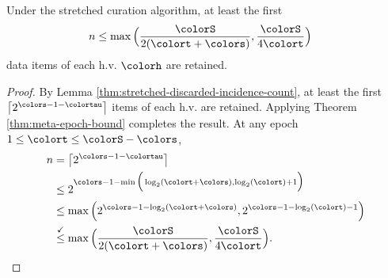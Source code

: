 \begin{corollary}
\label{thm:stretched-reservation-count}
Under the stretched curation algorithm, at least the first
\begin{align*}
n &\leq
\max\Big(
  \frac{\colorS}{2(\colort + \colors)},
  \frac{\colorS}{4\colort}
\Big)
\end{align*}
data items of each h.v. $\colorh$ are retained.
\end{corollary}
\begin{proof}

By Lemma \ref{thm:stretched-discarded-incidence-count}, at least the first $\left\lceil 2^{\colors - 1 - \colortau} \right\rceil$ items of each h.v. are retained.
Applying Theorem \ref{thm:meta-epoch-bound} completes the result.
At any epoch $1 \leq \colort \leq \colorS - \colors$,
\begin{align*}
n
&= \left\lceil 2^{\colors - 1 - \colortau} \right\rceil\\
&\leq2^{\colors - 1 - \min\Big(
  \log_2(\colort + \colors),
  \log_2(\colort) + 1
\Big)}\\
&\leq \max\Big(
  2^{\colors - 1 - \log_2(\colort + \colors)},
  2^{\colors - 1 - \log_2(\colort) - 1}
\Big)\\
&\stackrel{\checkmark}{\leq} \max\Big(
  \frac{\colorS}{2(\colort + \colors)},
  \frac{\colorS}{4\colort}
\Big).
\end{align*}

\end{proof}
